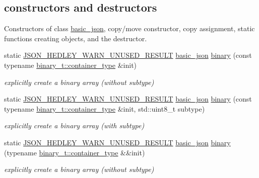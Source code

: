 \subsection*{constructors and destructors}
\label{_amgrpd94b4d3d0135946bb7bdf25e48755337}%
Constructors of class \hyperlink{classnlohmann_1_1basic__json}{basic\+\_\+json}, copy/move constructor, copy assignment, static functions creating objects, and the destructor. \begin{DoxyCompactItemize}
\item 
static \hyperlink{json_8hpp_a28d7e3b2d26bd5b8a3806da3db7dea03}{J\+S\+O\+N\+\_\+\+H\+E\+D\+L\+E\+Y\+\_\+\+W\+A\+R\+N\+\_\+\+U\+N\+U\+S\+E\+D\+\_\+\+R\+E\+S\+U\+LT} \hyperlink{classnlohmann_1_1basic__json}{basic\+\_\+json} \hyperlink{classnlohmann_1_1basic__json_a3d255dbe024ce2d0fdfb1b4837629091}{binary} (const typename \hyperlink{classnlohmann_1_1byte__container__with__subtype_a4d27e8633c5a5e3b49dd4ccb06515713}{binary\+\_\+t\+::container\+\_\+type} \&init)
\begin{DoxyCompactList}\small\item\em explicitly create a binary array (without subtype) \end{DoxyCompactList}\item 
static \hyperlink{json_8hpp_a28d7e3b2d26bd5b8a3806da3db7dea03}{J\+S\+O\+N\+\_\+\+H\+E\+D\+L\+E\+Y\+\_\+\+W\+A\+R\+N\+\_\+\+U\+N\+U\+S\+E\+D\+\_\+\+R\+E\+S\+U\+LT} \hyperlink{classnlohmann_1_1basic__json}{basic\+\_\+json} \hyperlink{classnlohmann_1_1basic__json_acd2c506b279049f7d92ad7ae10a2f12b}{binary} (const typename \hyperlink{classnlohmann_1_1byte__container__with__subtype_a4d27e8633c5a5e3b49dd4ccb06515713}{binary\+\_\+t\+::container\+\_\+type} \&init, std\+::uint8\+\_\+t subtype)
\begin{DoxyCompactList}\small\item\em explicitly create a binary array (with subtype) \end{DoxyCompactList}\item 
static \hyperlink{json_8hpp_a28d7e3b2d26bd5b8a3806da3db7dea03}{J\+S\+O\+N\+\_\+\+H\+E\+D\+L\+E\+Y\+\_\+\+W\+A\+R\+N\+\_\+\+U\+N\+U\+S\+E\+D\+\_\+\+R\+E\+S\+U\+LT} \hyperlink{classnlohmann_1_1basic__json}{basic\+\_\+json} \hyperlink{classnlohmann_1_1basic__json_ab085777bbfbfac5a472120b991ef5cf3}{binary} (typename \hyperlink{classnlohmann_1_1byte__container__with__subtype_a4d27e8633c5a5e3b49dd4ccb06515713}{binary\+\_\+t\+::container\+\_\+type} \&\&init)
\begin{DoxyCompactList}\small\item\em explicitly create a binary array (without subtype) \end{DoxyCompactList}\item 

\end{DoxyCompactItemize}
